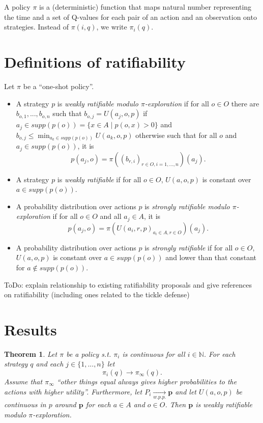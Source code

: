 \documentclass{article}
\newtheorem{thm}{Theorem} %
\begin{document}
A policy $\pi$ is a (deterministic) function that maps natural number representing the time and a set of Q-values for each pair of an action and an observation onto strategies. Instead of $\pi(i,q)$, we write $\pi_i(q)$.

\section*{Definitions of ratifiability}
Let $\pi$ be a \enquote{one-shot policy}.
\begin{itemize}
\item A strategy $p$ is \textit{weakly ratifiable modulo $\pi$-exploration} if for all $o\in O$ there are $b_{o,1},...,b_{o,n}$ such that $b_{o,j}=U(a_j,o,p)$ if $a_j\in supp (p(o))=\{x\in A\mid p(o,x)>0 \}$ and $b_{o,j}\leq\min_{a_k\in supp (p(o)) } U(a_k,o,p)$ otherwise such that for all $o$ and $a_j\in supp (p(o))$, it is
\begin{equation}
p(a_j,o)=\pi \left( (b_{r,i})_{r\in O, i=1,...,n} \right) (a_j).
\end{equation}
\item A strategy $p$ is \textit{weakly ratifiable} if for all $o\in O$, $U(a,o,p)$ is constant over $a\in supp(p(o))$.
\item A probability distribution over actions $p$ is \textit{strongly ratifiable modulo $\pi$-exploration} if for all $o\in O$ and all $a_j\in A$, it is
\begin{equation}
p(a_j, o)=\pi (U(a_i,r,p)_{a_i\in A, r\in O}) (a_j).
\end{equation}
\item A probability distribution over actions $p$ is \textit{strongly ratifiable} if for all $o\in O$, $U(a,o, p)$ is constant over $a\in supp(p(o))$ and lower than that constant for $a\notin supp(p(o))$.
\end{itemize}

ToDo: explain relationship to existing ratifiability proposals and give references on ratifiability (including ones related to the tickle defense)

\section*{Results}

\begin{thm}\label{theorem:weak-ratifiability-module-exploration}
Let $\pi$ be a policy s.t. $\pi_i$ is continuous for all $i\in \mathbb{N}$. For each strategy $q$ and each $j\in \{1,...,n\}$ let
\begin{equation}
\pi_i (q)\rightarrow \pi_\infty (q).
\end{equation}
Assume that $\pi_\infty$ \enquote{other things equal always gives higher probabilities to the actions with higher utility}.
Furthermore, let $P_i \underset{w.p.p.}{\rightarrow} \mathbf{p}$ and let $U(a,o,p)$ be continuous in $p$ around $\mathbf{p}$ for each $a\in A$ and $o\in O$. Then $\mathbf{p}$ is weakly ratifiable modulo $\pi$-exploration.
\end{thm}
\end{document}
